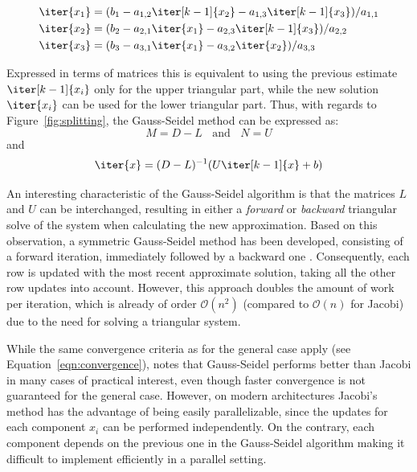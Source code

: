 \begin{equation}
\label{eqn:gauss_seidel}
   \begin{aligned}
    \iter{x_1} & =  (b_1 -a_{1,2}\iter[k-1]{x_2} - a_{1,3}\iter[k-1]{x_3})/a_{1,1} \\
    \iter{x_2} & =  (b_2 -a_{2,1}\iter{x_1} - a_{2,3}\iter[k-1]{x_3})/a_{2,2} \\
    \iter{x_3} & =  (b_3 -a_{3,1}\iter{x_1} - a_{3,2}\iter{x_2})/a_{3,3} \\
\end{aligned} 
\end{equation}

\noindent Expressed in terms of matrices this is equivalent to using the previous estimate $\iter[k-1]{x_i}$ only for the upper triangular part, while the new solution $\iter{x_i}$ can be used for the lower triangular part. Thus, with regards to Figure~\hyperref[fig:splitting]{\ref{fig:splitting}}, the Gauss-Seidel method can be expressed as:
\begin{equation}
    M=D-L \;\;\text{ and } \;\; N=U
\end{equation}
\noindent and
\begin{equation}
    \iter{x} = (D-L)^{-1}(U\iter[k-1]{x} +b)
\end{equation}

\noindent An interesting characteristic of the Gauss-Seidel algorithm is that the matrices $L$ and $U$ can be interchanged, resulting in either a \textit{forward} or \textit{backward} triangular solve of the system when calculating the new approximation. Based on this observation, a symmetric Gauss-Seidel method has been developed, consisting of a forward iteration, immediately followed by a backward one \cite{saad_iterative_2003}. Consequently, each row is updated with the most recent approximate solution, taking all the other row updates into account. However, this approach doubles the amount of work per iteration, which is already of order $\mathcal{O}(n^2)$ (compared to $\mathcal{O}(n)$ for Jacobi) due to the need for solving a triangular system. 

While the same convergence criteria as for the general case apply (see Equation~\hyperref[eqn:convergence]{\ref{eqn:convergence}}), \cite{venit_convergence_1975} notes that Gauss-Seidel performs better than Jacobi in many cases of practical interest, even though faster convergence is not guaranteed for the general case. However, on modern architectures Jacobi's method has the advantage of being easily parallelizable, since the updates for each component $x_i$ can be performed independently. On the contrary, each component depends on the previous one in the Gauss-Seidel algorithm making it difficult to implement efficiently in a parallel setting.

